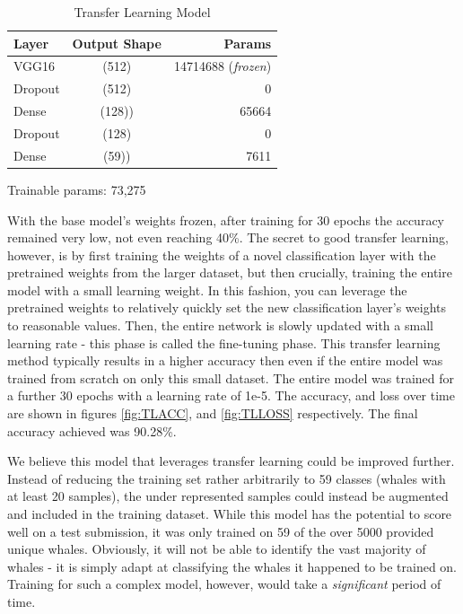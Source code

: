 \documentclass[paper=a4, fontsize=11pt]{scrartcl}
\numberwithin{equation}{section}		%
\numberwithin{table}{section}				%
\begin{document}
\begin{table}[h!]
  \begin{center}
    \caption{Transfer Learning Model}
    \label{tab:table2}
    \begin{tabular}{l|c|r} %
      \textbf{Layer} & \textbf{Output Shape} & \textbf{Params}\\
      \hline
      VGG16 & (512) & 14714688 (\textit{frozen})\\
      Dropout & (512) & 0\\
      Dense & (128)) & 65664\\
      Dropout & (128) & 0\\
      Dense & (59)) & 7611\\
    \end{tabular}
      \small
      \item Trainable params: 73,275
  \end{center}
\end{table}

With the base model's weights frozen, after training for 30 epochs the accuracy remained very low, not even reaching 40\%. The secret to good transfer learning, however, is by first training the weights of a novel classification layer with the pretrained weights from the larger dataset, but then crucially, training the entire model with a small learning weight. In this fashion, you can leverage the pretrained weights to relatively quickly set the new classification layer's weights to reasonable values. Then, the entire network is slowly updated with a small learning rate - this phase is called the fine-tuning phase. This transfer learning method typically results in a higher accuracy then even if the entire model was trained from scratch on only this small dataset. The entire model was trained for a further 30 epochs with a learning rate of 1e-5. The accuracy, and loss over time are shown in figures \autoref{fig:TLACC}, and \autoref{fig:TLLOSS} respectively. The final accuracy achieved was 90.28\%.

We believe this model that leverages transfer learning could be improved further. Instead of reducing the training set rather arbitrarily to 59 classes (whales with at least 20 samples), the under represented samples could instead be augmented and  included in the training dataset. While this model has the potential to score well on a test submission, it was only trained on 59 of the over 5000 provided unique whales. Obviously, it will not be able to identify the vast majority of whales - it is simply adapt at classifying the whales it happened to be trained on. Training for such a complex model, however, would take a \textit{significant} period of time.
\end{document}
